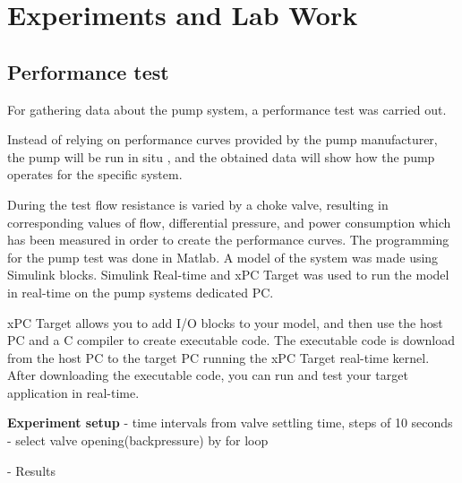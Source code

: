 \chapter{Experiments and Lab Work}\label{ch:experiment} 
\section{Performance test}\label{sec:performance_test} 
For gathering data about the pump system, a performance test was carried out.

Instead of relying on performance curves provided by the pump manufacturer,
the pump will be run in situ , and the obtained data will show how the pump 
operates for the specific system.
 
During the test flow resistance is varied by a choke valve, resulting in 
corresponding values of flow, differential pressure, and power consumption 
which has been measured in order to create the performance curves.
\newline
\newline
The programming for the pump test was done in Matlab. 
A model of the system was made using Simulink blocks. 
Simulink Real-time and xPC Target was used to run the model in real-time 
on the pump systems dedicated PC. 


xPC Target allows you to add I/O blocks to your model, and then use the host 
PC and a C compiler to create executable code. The executable code is download 
from the host PC to the target PC running the xPC Target real-time kernel. 
After downloading the executable code, you can run and test your target 
application in real-time. 


\textbf{Experiment setup}
- time intervals from valve settling time, steps of 10 seconds
- select valve opening(backpressure) by for loop


- Results
 